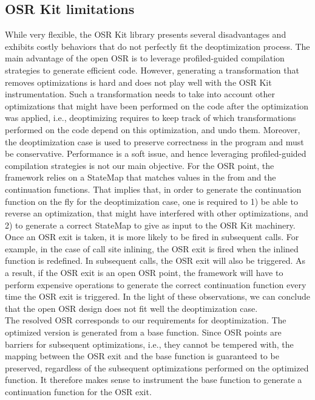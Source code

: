 \subsection{OSR Kit limitations}
While very flexible, the OSR Kit\cite{OSRKit} library presents several disadvantages and exhibits costly behaviors that do not perfectly fit the deoptimization process.
The main advantage of the open OSR is to leverage profiled-guided compilation strategies to generate efficient code.
However, generating a transformation that removes optimizations is hard and does not play well with the OSR Kit instrumentation.
Such a transformation needs to take into account other optimizations that might have been performed on the code after the optimization was applied, i.e., deoptimizing requires to keep track of which transformations performed on the code depend on this optimization, and undo them.
Moreover, the deoptimization case is used to preserve correctness in the program and must be conservative. 
Performance is a soft issue, and hence leveraging profiled-guided compilation strategies is not our main objective. 
For the OSR point, the framework relies on a StateMap that matches values in the from and the continuation functions.
That implies that, in order to generate the continuation function on the fly for the deoptimization case, one is required to 1) be able to reverse an optimization, that might have interfered with other optimizations, and 2) to generate a correct StateMap to give as input to the OSR Kit machinery.\\

Once an OSR exit is taken, it is more likely to be fired in subsequent calls.
For example, in the case of call site inlining, the OSR exit is fired when the inlined function is redefined.
In subsequent calls, the OSR exit will also be triggered.
As a result, if the OSR exit is an open OSR point, the framework will have to perform expensive operations to generate the correct continuation function every time the OSR exit is triggered.
In the light of these observations, we can conclude that the open OSR design does not fit well the deoptimization case.\\

The resolved OSR corresponds to our requirements for deoptimization.
The optimized version is generated from a base function.
Since OSR points are barriers for subsequent optimizations, i.e., they cannot be tempered with, the mapping between the OSR exit and the base function is guaranteed to be preserved, regardless of the subsequent optimizations performed on the optimized function.
It therefore makes sense to instrument the base function to generate a continuation function for the OSR exit.\\

